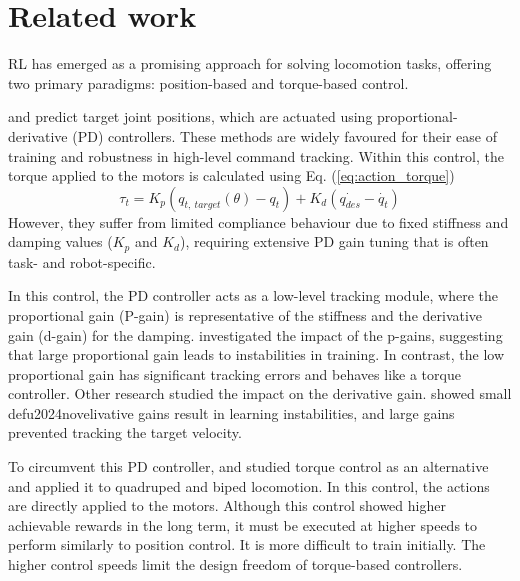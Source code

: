 \section{Related work}
RL has emerged as a promising approach for solving locomotion tasks, offering two primary paradigms: position-based and torque-based control.

\cite{genloco} and \cite{dreamwaq} predict target joint positions, which are actuated using proportional-derivative (PD) controllers. These methods are widely favoured for their ease of training and robustness in high-level command tracking. 
Within this control, the torque applied to the motors is calculated using Eq. (\ref{eq:action_torque})
\begin{equation}
\tau_t = K_p (q_{t,\ target}(\theta)- q_t) + K_d ( \dot{q_{des}} - \dot{q_t} ) \label{eq:action_torque}
\end{equation}
However, they suffer from limited compliance behaviour due to fixed stiffness and damping values (\(K_p\) and \(K_d\)), requiring extensive PD gain tuning that is often task- and robot-specific. \cite{genloco} 

In this control, the PD controller acts as a low-level tracking module, where the proportional gain (P-gain) is representative of the stiffness and the derivative gain (d-gain) for the damping. \cite{9560837} investigated the impact of the p-gains, suggesting that large proportional gain leads to instabilities in training. In contrast, the low proportional gain has significant tracking errors and behaves like a torque controller. Other research studied the impact on the derivative gain.\cite{smith2023demonstrating} showed small defu2024novelivative gains result in learning instabilities, and large gains prevented tracking the target velocity. 

To circumvent this PD controller, \cite{torque_quadro} and \cite{torque_biped} studied torque control as an alternative and applied it to quadruped and biped locomotion. In this control, the actions are directly applied to the motors.
Although this control showed higher achievable rewards in the long term, it must be executed at higher speeds to perform similarly to position control. It is more difficult to train initially. The higher control speeds limit the design freedom of torque-based controllers. 

